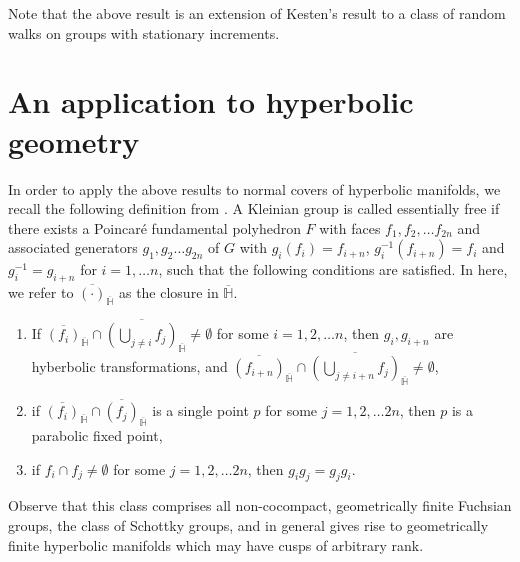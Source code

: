 \documentclass[10pt]{article}
\theoremstyle{mystyle}
\renewcommand{\H}{\mathbb{H}}
\newcommand{\1}{\mathbf{1}}
\begin{document}
Note that the above result is an extension of Kesten's result to a class of random walks on groups with stationary increments.



%

\section{An application to hyperbolic geometry}
In order to apply the above results to normal covers of hyperbolic manifolds, we recall the following definition from \cite{StadlbauerStratmann:2005}. A Kleinian group is called essentially free if there exists a Poincar\'e fundamental polyhedron $F$ with faces $f_1, f_2, \ldots f_{2n}$ and associated generators $g_1,g_2 \ldots g_{2n}$ of $G$ with $g_{i}(f_i) = f_{i+n}$, $g^{-1}_{i}(f_{i+n}) = f_{i}$ and $g_i^{-1}=g_{i+n}$ for $i=1,\ldots n$, such that the following conditions are satisfied. In here, we refer to  $\overline{(\cdot)}_{\overline{\H}}$ as the closure in $\overline{\H}$. 
\begin{enumerate} 
\item If $\overline{(f_i)}_{\overline{\H}} \cap \overline{(\bigcup_{j\neq i}f_j)}_{\overline{\H}} \neq \emptyset $ for some $i =1,2,\ldots n$, then  $g_i,g_{i+n}$ are hyberbolic transformations, and $\overline{(f_{i+n})}_{\overline{\H}} \cap \overline{(\bigcup_{j\neq i+n}f_j)}_{\overline{\H}} \neq \emptyset $,    
\item if $\overline{(f_i)}_{\overline{\H}}\cap \overline{(f_j)}_{\overline{\H}}$ is a single point $p$ for some $j =1,2,\ldots 2n$, then $p$ is a parabolic fixed point,
\item if $f_i \cap f_j \neq \emptyset$ for some $j =1,2,\ldots 2n$, then $g_ig_j = g_jg_i$.
\end{enumerate}
Observe that this class comprises all non-cocompact, geometrically finite Fuchsian groups, the class of Schottky groups, and in general gives rise to geometrically finite hyperbolic manifolds which may have cusps of arbitrary rank.
\end{document}
